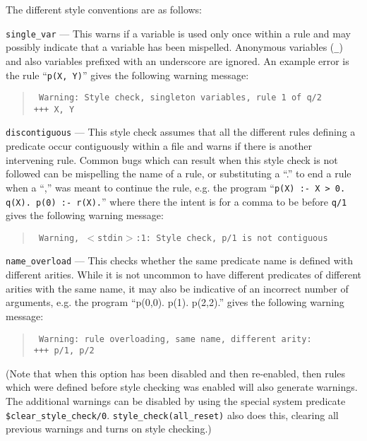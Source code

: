 \noindent
The different style conventions are as follows:
\begin{description}
\item{{\tt single\_var} ---}
This warns if a variable is used only once within a rule and may
possibly indicate that a variable has been mispelled. Anonymous
variables ({\tt \_}) and also variables prefixed with an underscore
are ignored. An example error is the rule ``{\tt p(X, Y)}'' gives
the following warning message:

\begin{quotation}
\tt
Warning: Style check, singleton variables, rule 1 of q/2 \\
 +++  X, Y
\end{quotation}

\item{{\tt discontiguous} ---}
This style check assumes that all the different rules defining
a predicate occur contiguously within a file and warns if there
is another intervening rule. Common bugs which
can result when this style check is not followed
can be
mispelling the name of a rule, or substituting a ``.'' 
to end a rule when a ``,'' was meant to continue the rule,
e.g. the program ``{\tt p(X) :- X > 0. q(X). p(0) :- r(X).}''
where there the intent is for a comma to be before {\tt q/1}
gives the following warning message:

\begin{quotation}
\tt
Warning, $<$stdin$>$:1: Style check, p/1 is not contiguous
\end{quotation}

\item{{\tt name\_overload} ---}
This checks whether the same predicate name is defined with
different arities.
While it is not uncommon to have different predicates of different
arities with the same name, it may also be indicative of an incorrect
number of arguments, e.g. the program ``p(0,0). p(1). p(2,2).''
gives the following warning message:

\begin{quotation}
\tt
Warning: rule overloading, same name, different arity: \\
 +++  p/1, p/2
\end{quotation}
\end{description}
(Note that when this option has been disabled and then re-enabled,
then rules which were defined before style checking was enabled
will also generate warnings. The additional warnings can be
disabled by using the special system predicate {\tt \$clear\_style\_check/0}.
{\tt style\_check(all\_reset)} also does this,
clearing all previous warnings and
turns on style checking.)

